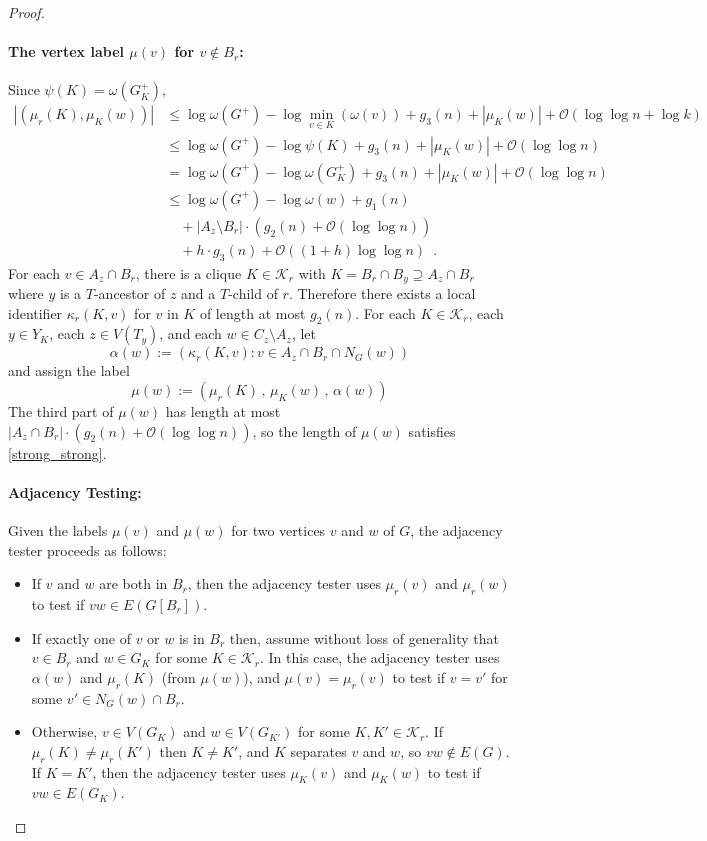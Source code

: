 \documentclass{patmorin}
\renewcommand{\le}{\leqslant}
\newcommand{\Oh}{\calO}
\let\eqref\cref
\newcommand{\calK}{\mathcal{K}}
\newcommand{\calO}{\mathcal{O}}
\begin{document}
\begin{proof}
    \paragraph{\boldmath The vertex label $\mu(v)$ for $v\not\in B_r$:}
    Since $\psi(K)=\omega(G^+_K)$,
    \begin{align*}
       |(\mu_r(K),\mu_K(w))|
       & \le \log \omega(G^+) - \log\min_{v\in K}(\omega(v)) + g_3(n) + |\mu_K(w)| + \Oh(\log\log n + \log k) \\
       & \le \log \omega(G^+) - \log\psi(K) + g_3(n) + |\mu_K(w)| + \Oh(\log\log n) \\
       & = \log \omega(G^+) - \log\omega(G^+_K) + g_3(n) + |\mu_K(w)| + \Oh(\log\log n) \\
       & \le \log \omega(G^+) - \log\omega(w) + g_1(n) \\
       & \quad {} + |A_z\setminus B_r|\cdot (g_2(n) + \Oh(\log\log n)) \\
       & \quad {} + h\cdot g_3(n) + \Oh((1+h)\log\log n) \enspace .
    \end{align*}
    For each $v\in A_z\cap B_r$, there is a clique $K\in\calK_r$ with $K=B_r\cap B_y\supseteq A_z\cap B_r$ where $y$ is a $T$-ancestor of $z$ and a $T$-child of $r$.
    Therefore there exists a local identifier $\kappa_r(K,v)$ for $v$ in $K$ of length at most $g_2(n)$.
    For each $K\in\calK_r$, each $y\in Y_K$, each $z\in V(T_y)$, and each $w\in C_z\setminus A_z$, let
    \[
        \alpha(w):=(\kappa_r(K,v): v\in A_z\cap B_r\cap N_G(w))
    \]
     and assign the label
    \[
       \mu(w) := (\mu_r(K)\,,\, \mu_K(w)\,,\, \alpha(w) )
    \]
    The third part of $\mu(w)$ has length at most $|A_z\cap B_r|\cdot (g_2(n) + \Oh(\log\log n))$, so the length of $\mu(w)$ satisfies \eqref{strong_strong}.

    \paragraph{Adjacency Testing:}
    Given the labels $\mu(v)$ and $\mu(w)$ for two vertices $v$ and $w$ of $G$, the adjacency tester proceeds as follows:
    \begin{itemize}
      \item If $v$ and $w$ are both in $B_r$, then the adjacency tester uses $\mu_r(v)$ and $\mu_r(w)$ to test if $vw\in E(G[B_r])$.
      \item If exactly one of $v$ or $w$ is in $B_r$ then, assume without loss of generality that $v\in B_r$ and $w\in G_K$ for some $K\in\calK_r$.
      In this case, the adjacency tester uses $\alpha(w)$ and $\mu_r(K)$ (from $\mu(w)$), and $\mu(v)=\mu_r(v)$ to test if $v=v'$ for some $v'\in N_G(w)\cap B_r$.
      \item Otherwise, $v\in V(G_K)$ and $w\in V(G_{K'})$ for some $K,K'\in\calK_r$.
      If $\mu_r(K)\neq\mu_r(K')$ then $K\neq K'$, and $K$ separates $v$ and $w$, so $vw\not\in E(G)$.
      If $K=K'$, then the adjacency tester uses $\mu_K(v)$ and $\mu_K(w)$ to test if $vw\in E(G_K)$.
    \end{itemize}


\end{proof}
\end{document}
